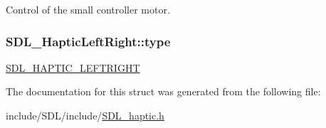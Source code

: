 Control of the small controller motor. \hypertarget{struct_s_d_l___haptic_left_right_abef79eeb482a8e623e512f0c9635e1a1}{
\subsubsection[{type}]{ S\-D\-L\-\_\-\-Haptic\-Left\-Right\-::type}}\label{struct_s_d_l___haptic_left_right_abef79eeb482a8e623e512f0c9635e1a1}
\hyperlink{_s_d_l__haptic_8h_ae047624d8458ff6400887c37a36f86d3}{S\-D\-L\-\_\-\-H\-A\-P\-T\-I\-C\-\_\-\-L\-E\-F\-T\-R\-I\-G\-H\-T} 

The documentation for this struct was generated from the following file\-:\begin{DoxyCompactItemize}
\item 
include/\-S\-D\-L/include/\hyperlink{_s_d_l__haptic_8h}{S\-D\-L\-\_\-haptic.\-h}\end{DoxyCompactItemize}
